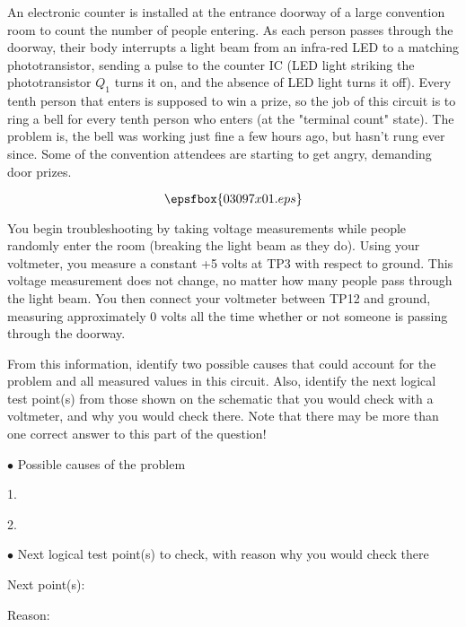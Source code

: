 

An electronic counter is installed at the entrance doorway of a large convention room to count the number of people entering.  As each person passes through the doorway, their body interrupts a light beam from an infra-red LED to a matching phototransistor, sending a pulse to the counter IC (LED light striking the phototransistor $Q_1$ turns it on, and the absence of LED light turns it off).  Every tenth person that enters is supposed to win a prize, so the job of this circuit is to ring a bell for every tenth person who enters (at the "terminal count" state).  The problem is, the bell was working just fine a few hours ago, but hasn't rung ever since.  Some of the convention attendees are starting to get angry, demanding door prizes.

$$\epsfbox{03097x01.eps}$$

You begin troubleshooting by taking voltage measurements while people randomly enter the room (breaking the light beam as they do).  Using your voltmeter, you measure a constant +5 volts at TP3 with respect to ground.  This voltage measurement does not change, no matter how many people pass through the light beam.  You then connect your voltmeter between TP12 and ground, measuring approximately 0 volts all the time whether or not someone is passing through the doorway.

From this information, identify two possible causes that could account for the problem and all measured values in this circuit.  Also, identify the next logical test point(s) from those shown on the schematic that you would check with a voltmeter, and why you would check there.  Note that there may be more than one correct answer to this part of the question!

\medskip
\goodbreak
\item{$\bullet$} Possible causes of the problem
\item{1.}
\item{2.} 
\medskip

\medskip
\item{$\bullet$} Next logical test point(s) to check, with reason why you would check there
\item{Next point(s):}
\item{Reason:}
\medskip






